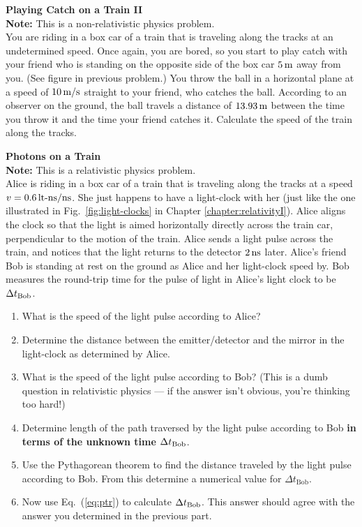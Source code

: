 \begin{problem}{\bf Playing Catch on a Train II}\\
{\bf Note:} This is a non-relativistic physics problem.\\ You are riding in a
box car of a train that is traveling along the tracks at an undetermined
speed.  Once again, you are bored, so you start to play catch with your
friend who is standing on the opposite side of the box car $5\,\mbox{m}$
away from you.  (See figure in previous problem.)  You throw the ball
in a horizontal plane at a speed of $10\,\mbox{m/s}$ straight to your
friend, who catches the ball.  According to an observer on the ground,
the ball travels a distance of $13.93\,\mbox{m}$ between the time you
throw it and the time your friend catches it.  Calculate the speed of
the train along the tracks.
\label{prob:catch_on_trainII}
\end{problem}

\begin{problem}{\bf Photons on a Train}\\
{\bf Note:} This is a relativistic physics problem.\\ Alice is riding
in a box car of a train that is traveling along the tracks at a speed
$v=0.6\,\mbox{lt-ns/ns}$.  She just happens to have a light-clock with her
(just like the one illustrated in Fig.~\ref{fig:light-clocks} in Chapter
\ref{chapter:relativityI}).  Alice aligns the clock so that the light
is aimed horizontally directly across the train car, perpendicular to
the motion of the train.  Alice sends a light pulse across the train,
and notices that the light returns to the detector $2\,\mbox{ns}$ later.
Alice's friend Bob is standing at rest on the ground as Alice and her
light-clock speed by.  Bob measures the round-trip time for the pulse
of light in Alice's light clock to be $\Delta t_{\rm Bob}$.
\begin{enumerate}
\item What is the speed of the light pulse according to Alice?
\item Determine the distance between the emitter/detector and the mirror
in the light-clock as determined by Alice.
\item  What is the speed of the light pulse according to Bob?  (This is
a dumb question in relativistic physics --- if the answer isn't obvious,
you're thinking too hard!)
\item Determine length of the path traversed by the light pulse according
to Bob {\bf in terms of the unknown time $\Delta t_{\rm Bob}$}.
\item Use the Pythagorean theorem  to find the distance
traveled by the light pulse according to Bob. From this determine
a numerical value for $\Delta t_\text{Bob}$.

\item Now use Eq.~(\ref{eq:ptr}) to calculate $\Delta t_{\rm Bob}$.
This answer should agree with the answer you determined in the previous
part.
\end{enumerate}
\end{problem}
\newpage
